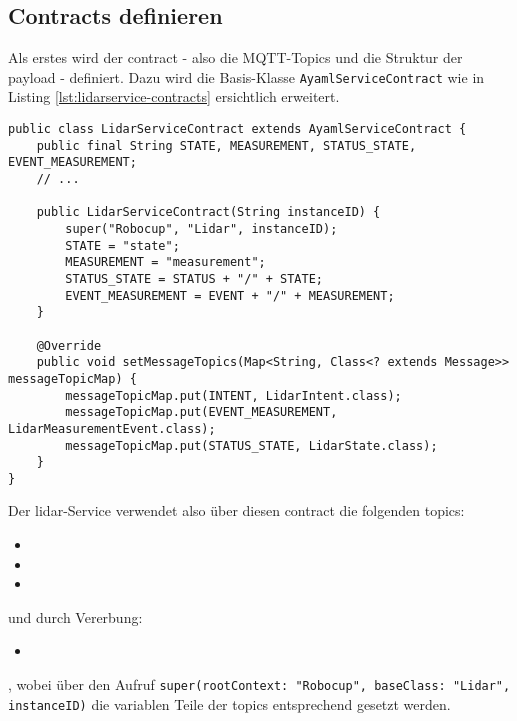 \subsection{Contracts definieren}
Als erstes wird der \Gls{contract} - also die MQTT-Topics und die Struktur der \Gls{payload} - definiert. Dazu wird die Basis-Klasse \verb|AyamlServiceContract| wie in Listing \ref{lst:lidarservice-contracts} ersichtlich erweitert.
\begin{lstlisting}[caption={TiM55x-Service - Contracts},label={lst:lidarservice-contracts}]
public class LidarServiceContract extends AyamlServiceContract {
    public final String STATE, MEASUREMENT, STATUS_STATE, EVENT_MEASUREMENT;
    // ...

    public LidarServiceContract(String instanceID) {
        super("Robocup", "Lidar", instanceID);
        STATE = "state";
        MEASUREMENT = "measurement";
        STATUS_STATE = STATUS + "/" + STATE;
        EVENT_MEASUREMENT = EVENT + "/" + MEASUREMENT;
    }

    @Override
    public void setMessageTopics(Map<String, Class<? extends Message>> messageTopicMap) {
        messageTopicMap.put(INTENT, LidarIntent.class);
        messageTopicMap.put(EVENT_MEASUREMENT, LidarMeasurementEvent.class);
        messageTopicMap.put(STATUS_STATE, LidarState.class);
    }
}
\end{lstlisting}
Der \acrshort{lidar}-Service verwendet also über diesen \Gls{contract} die folgenden \Glspl{topic}:
\begin{itemize}
	\item {}
	\item {}
	\item {}
\end{itemize}
und durch Vererbung:
\begin{itemize}
	\item {}
\end{itemize}
, wobei über den Aufruf \verb|super(rootContext: "Robocup", baseClass: "Lidar", instanceID)| die variablen Teile der \Glspl{topic} entsprechend gesetzt werden.

